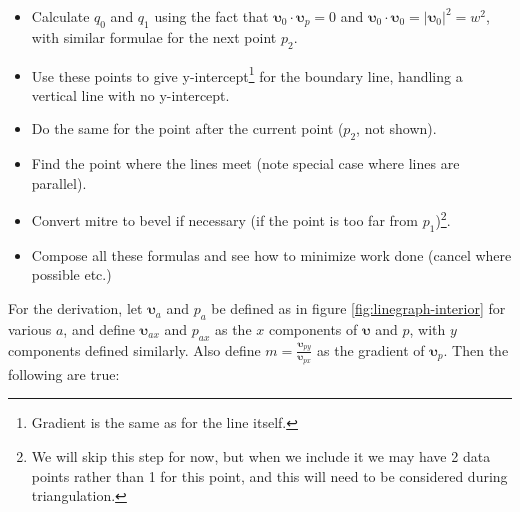\documentclass[]{article}
\begin{document}
\begin{itemize}
	\item Calculate $q_0$ and $q_1$ using the fact that $\bm{\upsilon}_0 \cdot \bm{\upsilon}_p = 0$ and $\bm{\upsilon}_0 \cdot \bm{\upsilon}_0 = |\bm{\upsilon}_0|^2 = w^2$, with similar formulae for the next point $p_2$.
	\item Use these points to give y-intercept\footnote{Gradient is the same as for the line itself.} for the boundary line, handling a vertical line with no y-intercept.
	\item Do the same for the point after the current point ($p_2$, not shown).
	\item Find the point where the lines meet (note special case where lines are parallel).
	\item Convert mitre to bevel if necessary (if the point is too far from $p_1$)\footnote{We will skip this step for now, but when we include it we may have 2 data points rather than 1 for this point, and this will need to be considered during triangulation.}.
	\item Compose all these formulas and see how to minimize work done (cancel where possible etc.)
\end{itemize}

For the derivation, let $\bm{\upsilon}_a$ and $p_a$ be defined as in figure \ref{fig:linegraph-interior} for various $a$, and define $\bm{\upsilon}_{ax}$ and $p_{ax}$ as the $x$ components of $\bm{\upsilon}$ and $p$, with $y$ components defined similarly. Also define $m = \frac{\bm{\upsilon}_{py}}{\bm{\upsilon}_{px}}$ as the gradient of $\bm{\upsilon}_p$. Then the following are true:
\end{document}
